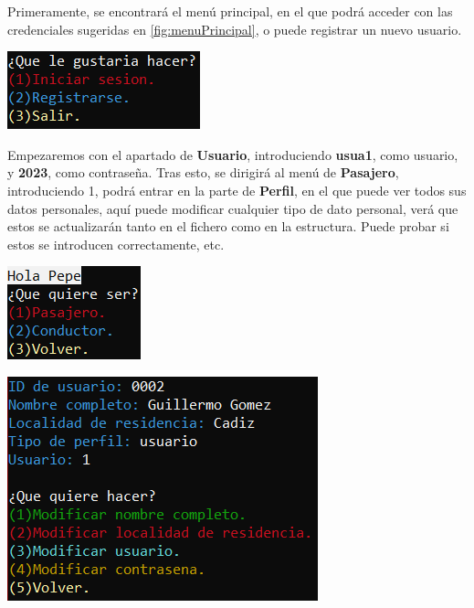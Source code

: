 Primeramente, se encontrará el menú principal, en el que podrá acceder con las credenciales sugeridas en \ref{fig:menuPrincipal}, o puede registrar un nuevo usuario.
\begin{center}
\includegraphics[]{FOTOS/menuPrincipal.png}
\end{center}
Empezaremos con el apartado de \textbf{Usuario}, introduciendo \textbf{usua1}, como usuario, y \textbf{2023}, como contraseña. 
Tras esto, se dirigirá al menú de \textbf{Pasajero}, introduciendo 1, podrá entrar en la parte de \textbf{Perfil}, en el que puede ver todos sus datos personales,
aquí puede modificar cualquier tipo de dato personal, verá que estos se actualizarán tanto en el fichero como en la estructura. Puede probar si estos se introducen correctamente, etc.
\begin{center}
    \begin{center}
      \includegraphics[]{FOTOS/menuSeleccionUsuario.png}
    \end{center}
    \begin{center}
      \includegraphics[]{FOTOS/menuPasajeroPerfil.png}
    \end{center}
\end{center}

